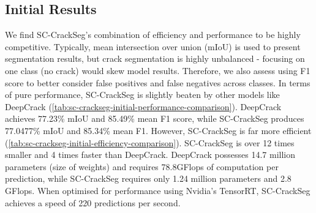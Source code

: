 \documentclass[a4paper,12pt]{report}
\begin{document}
\subsection{Initial Results}
We find SC-CrackSeg's combination of efficiency and performance to be highly competitive. Typically, mean intersection over union (mIoU) is used to present segmentation results, but crack segmentation is highly unbalanced - focusing on one class (no crack) would skew model results. Therefore, we also assess using F1 score to better consider false positives and false negatives across classes. In terms of pure performance, SC-CrackSeg is slightly beaten by other models like DeepCrack (\autoref{tab:sc-crackseg-initial-performance-comparison}). DeepCrack achieves 77.23\% mIoU and 85.49\% mean F1 score, while SC-CrackSeg produces 77.0477\% mIoU and 85.34\% mean F1. However, SC-CrackSeg is far more efficient (\autoref{tab:sc-crackseg-initial-efficiency-comparison}). SC-CrackSeg is over 12 times smaller and 4 times faster than DeepCrack. DeepCrack possesses 14.7 million parameters (size of weights) and requires 78.8GFlops of computation per prediction, while SC-CrackSeg requires only 1.24 million parameters and 2.8 GFlops. When optimised for performance using Nvidia's TensorRT, SC-CrackSeg achieves a speed of 220 predictions per second.
\end{document}
